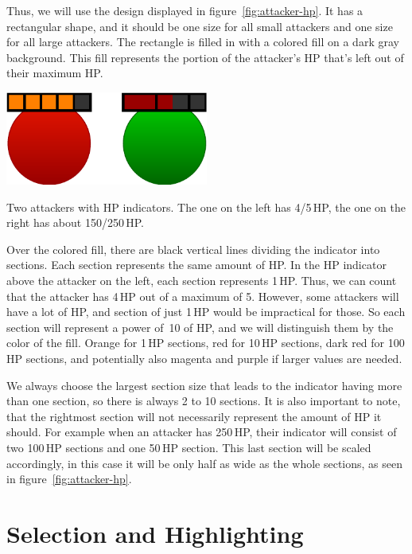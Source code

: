Thus, we will use the design displayed in figure~\ref{fig:attacker-hp}.
It has a rectangular shape, and it should be one size for all small attackers and one size for all large attackers.
The rectangle is filled in with a colored fill on a dark gray background.
This fill represents the portion of the attacker's HP that's left out of their maximum HP.

\begin{center}
    \captionsetup{type=figure}
    \includegraphics[width=0.5\textwidth]{img/Attacker HP.pdf}
    \caption{Two attackers with HP indicators. The one on the left has 4/5\,HP, the one on the right has about 150/250\,HP.}
    \label{fig:attacker-hp}
\end{center}

Over the colored fill, there are black vertical lines dividing the indicator into sections.
Each section represents the same amount of HP.
In the HP indicator above the attacker on the left, each section represents 1\,HP.
Thus, we can count that the attacker has 4\,HP out of a maximum of 5.
However, some attackers will have a lot of HP, and section of just 1\,HP would be impractical for those.
So each section will represent a power of~10 of HP, and we will distinguish them by the color of the fill.
Orange for 1\,HP sections, red for 10\,HP sections, dark red for 100\,HP sections, and potentially also magenta and purple if larger values are needed.

We always choose the largest section size that leads to the indicator having more than one section, so there is always 2 to 10 sections.
It is also important to note, that the rightmost section will not necessarily represent the amount of HP it should.
For example when an attacker has 250\,HP, their indicator will consist of two 100\,HP sections and one 50\,HP section.
This last section will be scaled accordingly, in this case it will be only half as wide as the whole sections, as seen in figure~\ref{fig:attacker-hp}.

\section{Selection and Highlighting}

